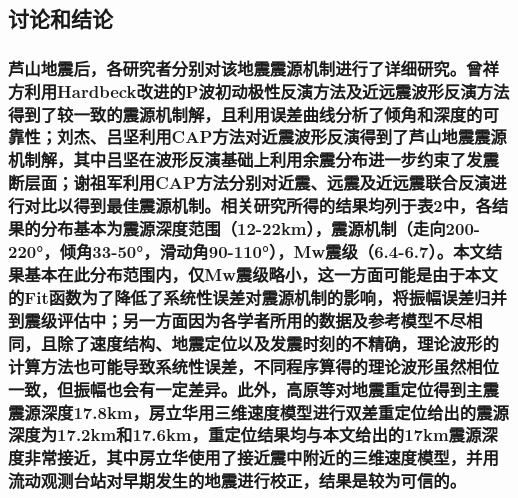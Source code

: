 \documentclass[a4paper,12pt,single,pdftex]{scrartcl}
\begin{document}
\label{ID_1705787296}\subsubsection{}

\label{ID_78066170}\subsubsection{}

\label{ID_1122523796}\subsubsection{}

\label{ID_366051100}\subsubsection{}

\label{ID_1371023412}\subsubsection{}

\label{ID_77282899}\subsection{讨论和结论}

\label{ID_1559489052}\subsubsection{芦山地震后，各研究者分别对该地震震源机制进行了详细研究。曾祥方\cite{曾祥方2013}利用Hardbeck\cite{Hardebeck2002}改进的P波初动极性反演方法及近远震波形反演方法得到了较一致的震源机制解，且利用误差曲线分析了倾角和深度的可靠性；刘杰\cite{刘杰2013}、吕坚\cite{吕坚2013}利用CAP方法对近震波形反演得到了芦山地震震源机制解，其中吕坚在波形反演基础上利用余震分布进一步约束了发震断层面；谢祖军\cite{谢祖军2013}利用CAP方法分别对近震、远震及近远震联合反演进行对比以得到最佳震源机制。相关研究所得的结果均列于表2中，各结果的分布基本为震源深度范围（12-22km），震源机制（走向200-220°，倾角33-50°，滑动角90-110°），Mw震级（6.4-6.7）。本文结果基本在此分布范围内，仅Mw震级略小，这一方面可能是由于本文的Fit函数为了降低了系统性误差对震源机制的影响，将振幅误差归并到震级评估中；另一方面因为各学者所用的数据及参考模型不尽相同，且除了速度结构、地震定位以及发震时刻的不精确，理论波形的计算方法也可能导致系统性误差，不同程序算得的理论波形虽然相位一致，但振幅也会有一定差异\cite{Herrmann1985}。此外，高原等\cite{高原2013}对地震重定位得到主震震源深度17.8km，房立华\cite{房立华2013}用三维速度模型进行双差重定位给出的震源深度为17.2km和17.6km，重定位结果均与本文给出的17km震源深度非常接近，其中房立华使用了接近震中附近的三维速度模型，并用流动观测台站对早期发生的地震进行校正，结果是较为可信的。}
\end{document}

